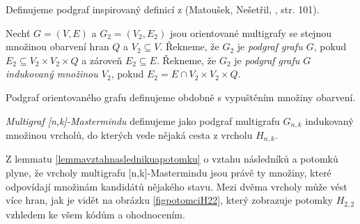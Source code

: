 Definujeme podgraf inspirovaný definicí z (Matoušek, Nešetřil, \cite{matouvsek2009kapitoly}, str. 101).
\begin{definice}[Podgraf]
    Nechť $G = (V,E)$ a $G_2 = (V_2, E_2)$ jsou orientované multigrafy se stejnou množinou obarvení hran $Q$ a $V_2 \subseteq V$. Řekneme, že $G_2$ je \emph{podgraf grafu $G$}, pokud $E_2 \subseteq V_2 \times V_2 \times Q$ a zároveň $E_2 \subseteq E$.
    Řekneme, že $G_2$ je \emph{podgraf grafu $G$ indukovaný množinou $V_2$}, pokud $E_2 =  E \cap V_2\times V_2 \times Q$.
\end{definice}
\begin{pozn}
    Podgraf orientovaného grafu definujeme obdobně s vypuštěním množiny obarvení. 
\end{pozn}


\begin{definice}
  \emph{Multigraf [n,k]-Mastermindu} definujeme jako podgraf multigrafu $G_{n,k}$ indukovaný množinou vrcholů, do kterých vede nějaká cesta z vrcholu $H_{n,k}$. 
  
\end{definice}
Z lemmatu \ref{lemmavztahnaslednikuapotomku} o vztahu následníků a potomků plyne, že vrcholy multigrafu [n,k]-Mastermindu jsou právě ty množiny, které odpovídají množinám kandidátů nějakého stavu. Mezi dvěma vrcholy může vést více hran, jak je vidět na obrázku \ref{figpotomciH22}, který zobrazuje potomky $H_{2,2}$ vzhledem ke všem kódům a ohodnocením. 

